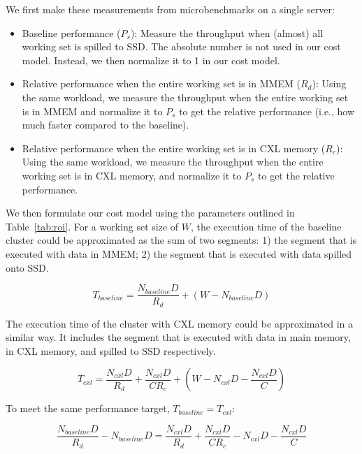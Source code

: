 We first make these measurements from microbenchmarks on a single server:
\begin{itemize}
  \item Baseline performance ($P_s$):
  Measure the throughput when (almost) all working set is spilled to SSD. The absolute number is not used in our cost model. Instead, we then normalize it to 1 in our cost model.
  \item Relative performance when the entire working set is in MMEM ($R_d$): Using the same workload, we measure the throughput when the entire working set is in MMEM and normalize it to $P_s$ to get the relative performance (i.e., how much faster compared to the baseline).
  \item Relative performance when the entire working set is in CXL memory ($R_c$): Using the same workload, we measure the throughput when the entire working set is in CXL memory, and normalize it to $P_s$ to get the relative performance.
\end{itemize}

We then formulate our cost model using the parameters outlined in Table~\ref{tab:roi}. For a working set size of $W$, the execution time of the baseline cluster could be approximated as the sum of two segments:
1) the segment that is executed with data in MMEM; 2) the segment that is executed with data spilled onto SSD.


$$
T_{baseline} = \frac{N_{baseline} D}{R_d} + (W - N_{baseline}D)
$$

The execution time of the cluster with CXL memory could be approximated in a similar way.
It includes the segment that is executed with data in main memory, in CXL memory, and spilled to SSD respectively.

$$ T_{cxl} = \frac{N_{cxl} D}{R_d} + \frac{N_{cxl} D}{CR_c} + (W - N_{cxl} D - \frac{N_{cxl} D}{C}) $$

To meet the same performance target, $T_{baseline} = T_{cxl}$:


$$
\frac{N_{baseline} D}{R_d} - N_{baseline} D = \frac{N_{cxl} D}{R_d} + \frac{N_{cxl} D}{CR_c} - N_{cxl} D - \frac{N_{cxl} D }{C}
$$

